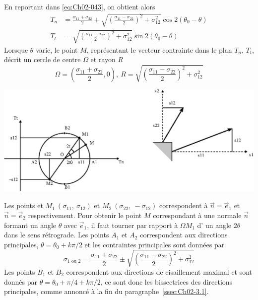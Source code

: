 En reportant dans \eqref{eq:Ch02-043}, on obtient alors 
\begin{equation}
    \begin{aligned}
        T_n &= \frac{\sigma_{11} + \sigma_{22}}{2} + \sqrt{\left( \frac{\sigma_{11} - \sigma_{22}}{2} \right)^2 + \sigma_{12}^2} \cos 2 \left( \theta_0 - \theta \right)\\
        T_t &= \sqrt{\left( \frac{\sigma_{11} - \sigma_{22}}{2} \right)^2 + \sigma_{12}^2} \sin 2 \left( \theta_0 - \theta \right)
    \end{aligned}
    \label{eq:Ch02-044}
\end{equation}
Lorsque $\theta$ varie, le point $M$, représentant le vecteur contrainte dans le plan $T_n$, $T_t$, décrit un cercle de centre $\Omega$ et rayon $R$
\begin{equation}
    \Omega = \left( \frac{\sigma_{11}+\sigma_{22}}{2}, 0 \right), \ R = \sqrt{\left( \frac{\sigma_{11} - \sigma_{22}}{2} \right)^2 + \sigma_{12}^2}
    \label{eq:Ch02-045}
\end{equation}
\begin{center}
    \includegraphics{../images/T1_Ch02-0017}
\end{center}
Les points  et $M_1\ \left( \sigma_{11},\ \sigma_{12} \right)$ et $M_2\ \left( \sigma_{22},\ -\sigma_{12} \right)$ correspondent à $\vec{n} = \vec{e}_1$ et $\vec{n}=\vec{e}_2$ respectivement. 
Pour obtenir le point $M$ correspondant à une normale $\vec{n}$ formant un angle $\theta$ avec $\vec{e}_1$, il faut tourner par rapport à $\Omega M_1$ d' un angle $2\theta$ dans le sens rétrograde.
Les points $A_1$ et $A_2$ correspondent aux directions principales, $\theta = \theta_0 + k\pi/2$ et les contraintes principales sont données par 
\begin{equation}
    \sigma_{1\text{ ou }2} = \frac{\sigma_{11} + \sigma_{22}}{2} \pm \sqrt{\left( \frac{\sigma_{11} - \sigma_{22}}{2} \right)^2 +\sigma_{12}^2}
    \label{eq:Ch02-046}
\end{equation}
Les points $B_1$ et $B_2$ correspondent aux directions de cisaillement maximal et sont donnés par $\theta = \theta_0 + \pi/4 + k\pi/2$, ce sont donc les bissectrices des directions principales, comme annoncé à la fin du paragraphe~\ref{ssec:Ch02-3.1}. 

